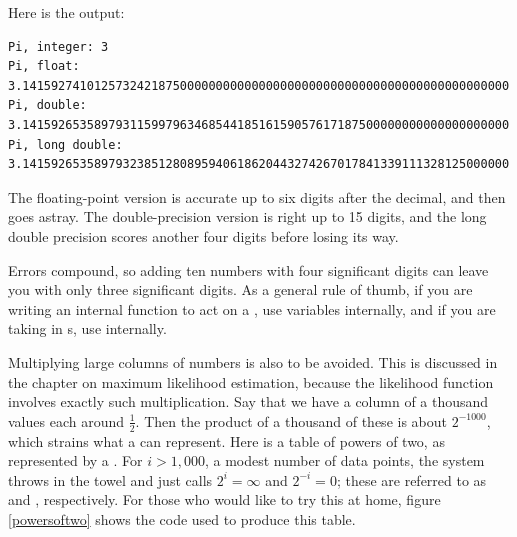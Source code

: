 
Here is the output:
\begin{lstlisting}[language={}]
Pi, integer: 3
Pi, float:  3.14159274101257324218750000000000000000000000000000000000000000000000
Pi, double:      3.14159265358979311599796346854418516159057617187500000000000000000000
Pi, long double: 3.14159265358979323851280895940618620443274267017841339111328125000000
\end{lstlisting}
The floating-point version is accurate up to six digits after the
decimal, and then goes astray. The double-precision version is right up to 15
digits, and the long double precision scores another four digits before
losing its way.

Errors compound, so adding ten numbers
with four significant digits can leave you with only three significant
digits. As a general rule of thumb, if you are writing an internal
function to act on a , use  variables internally,
and if you are taking in s, use  internally.

\label{precisionproblem}
Multiplying large columns of numbers is also to be avoided. This is
discussed in the chapter on maximum likelihood estimation, because the
likelihood function involves exactly such multiplication. Say that we
have a column of a thousand values each around $\frac{1}{2}$. Then the
product of a thousand of these is about $2^{-1000}$, which strains what
a  can represent. Here is a table of powers of two, as
represented by a . For $i>1,000$, a
modest number of data points, the system throws in the towel and just
calls $2^i = \infty$ and $2^{-i} = 0$; these are referred to as
 and , respectively. For those who would like
to try this at home, figure \ref{powersoftwo} shows the code used to
produce this table.


